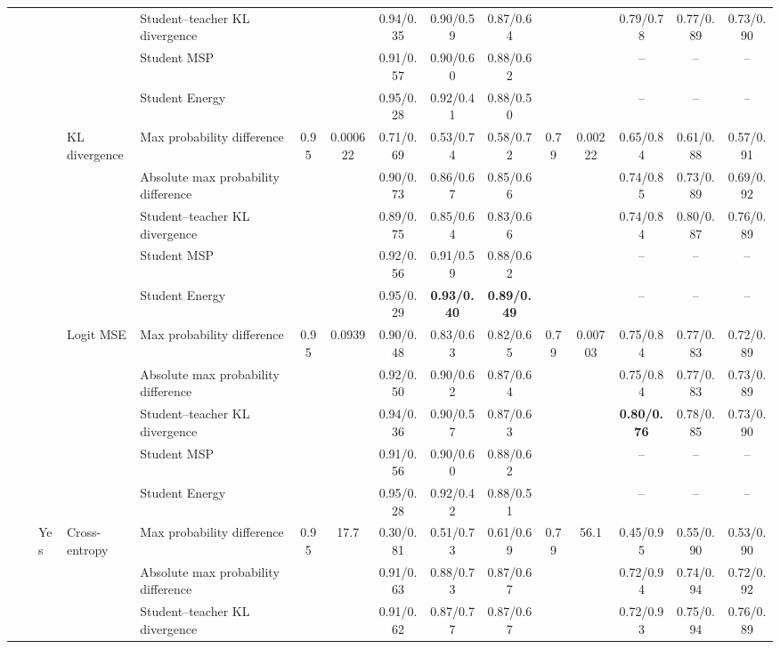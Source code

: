 \documentclass[border=2pt]{standalone}
\begin{document}
\begin{tabular}{lllllcccccccccc}
 &  &  &  & Student--teacher KL divergence &  &  & 0.94/0.35 & 0.90/0.59 & 0.87/0.64 &  &  & 0.79/0.78 & 0.77/0.89 & 0.73/0.90 \\
 &  &  &  & Student MSP &  &  & 0.91/0.57 & 0.90/0.60 & 0.88/0.62 &  &  & -- & -- & -- \\
 &  &  &  & Student Energy &  &  & 0.95/0.28 & 0.92/0.41 & 0.88/0.50 &  &  & -- & -- & -- \\
 &  &  & KL divergence & Max probability difference & 0.95 & 0.000622 & 0.71/0.69 & 0.53/0.74 & 0.58/0.72 & 0.79 & 0.00222 & 0.65/0.84 & 0.61/0.88 & 0.57/0.91 \\
 &  &  &  & Absolute max probability difference &  &  & 0.90/0.73 & 0.86/0.67 & 0.85/0.66 &  &  & 0.74/0.85 & 0.73/0.89 & 0.69/0.92 \\
 &  &  &  & Student--teacher KL divergence &  &  & 0.89/0.75 & 0.85/0.64 & 0.83/0.66 &  &  & 0.74/0.84 & 0.80/0.87 & 0.76/0.89 \\
 &  &  &  & Student MSP &  &  & 0.92/0.56 & 0.91/0.59 & 0.88/0.62 &  &  & -- & -- & -- \\
 &  &  &  & Student Energy &  &  & 0.95/0.29 & \textbf{0.93/0.40} & \textbf{0.89/0.49} &  &  & -- & -- & -- \\
 &  &  & Logit MSE & Max probability difference & 0.95 & 0.0939 & 0.90/0.48 & 0.83/0.63 & 0.82/0.65 & 0.79 & 0.00703 & 0.75/0.84 & 0.77/0.83 & 0.72/0.89 \\
 &  &  &  & Absolute max probability difference &  &  & 0.92/0.50 & 0.90/0.62 & 0.87/0.64 &  &  & 0.75/0.84 & 0.77/0.83 & 0.73/0.89 \\
 &  &  &  & Student--teacher KL divergence &  &  & 0.94/0.36 & 0.90/0.57 & 0.87/0.63 &  &  & \textbf{0.80/0.76} & 0.78/0.85 & 0.73/0.90 \\
 &  &  &  & Student MSP &  &  & 0.91/0.56 & 0.90/0.60 & 0.88/0.62 &  &  & -- & -- & -- \\
 &  &  &  & Student Energy &  &  & 0.95/0.28 & 0.92/0.42 & 0.88/0.51 &  &  & -- & -- & -- \\
 &  & Yes & Cross-entropy & Max probability difference & 0.95 & 17.7 & 0.30/0.81 & 0.51/0.73 & 0.61/0.69 & 0.79 & 56.1 & 0.45/0.95 & 0.55/0.90 & 0.53/0.90 \\
 &  &  &  & Absolute max probability difference &  &  & 0.91/0.63 & 0.88/0.73 & 0.87/0.67 &  &  & 0.72/0.94 & 0.74/0.94 & 0.72/0.92 \\
 &  &  &  & Student--teacher KL divergence &  &  & 0.91/0.62 & 0.87/0.77 & 0.87/0.67 &  &  & 0.72/0.93 & 0.75/0.94 & 0.76/0.89 \\

\end{tabular}
\end{document}
